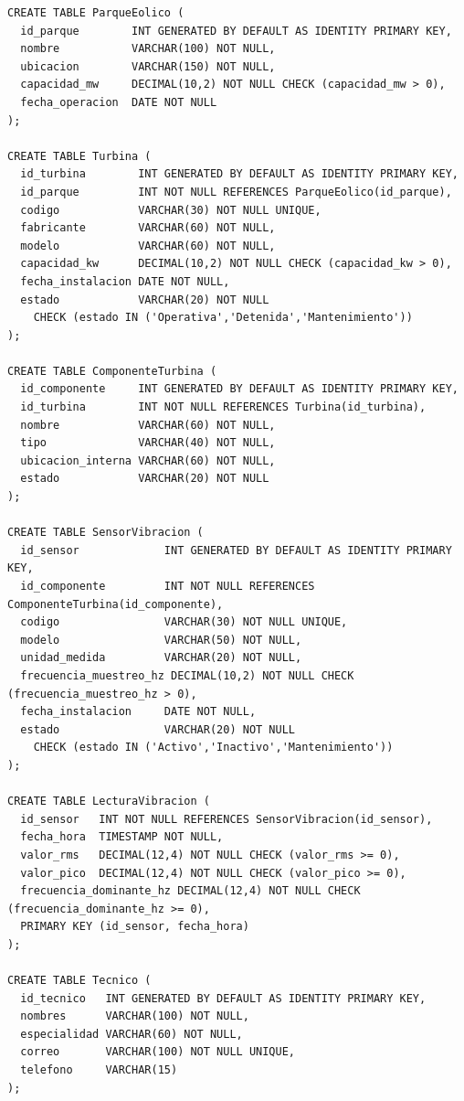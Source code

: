 \documentclass[11pt,a4paper]{article}
\begin{document}
\begin{lstlisting}
CREATE TABLE ParqueEolico (
  id_parque        INT GENERATED BY DEFAULT AS IDENTITY PRIMARY KEY,
  nombre           VARCHAR(100) NOT NULL,
  ubicacion        VARCHAR(150) NOT NULL,
  capacidad_mw     DECIMAL(10,2) NOT NULL CHECK (capacidad_mw > 0),
  fecha_operacion  DATE NOT NULL
);

CREATE TABLE Turbina (
  id_turbina        INT GENERATED BY DEFAULT AS IDENTITY PRIMARY KEY,
  id_parque         INT NOT NULL REFERENCES ParqueEolico(id_parque),
  codigo            VARCHAR(30) NOT NULL UNIQUE,
  fabricante        VARCHAR(60) NOT NULL,
  modelo            VARCHAR(60) NOT NULL,
  capacidad_kw      DECIMAL(10,2) NOT NULL CHECK (capacidad_kw > 0),
  fecha_instalacion DATE NOT NULL,
  estado            VARCHAR(20) NOT NULL
    CHECK (estado IN ('Operativa','Detenida','Mantenimiento'))
);

CREATE TABLE ComponenteTurbina (
  id_componente     INT GENERATED BY DEFAULT AS IDENTITY PRIMARY KEY,
  id_turbina        INT NOT NULL REFERENCES Turbina(id_turbina),
  nombre            VARCHAR(60) NOT NULL,
  tipo              VARCHAR(40) NOT NULL,
  ubicacion_interna VARCHAR(60) NOT NULL,
  estado            VARCHAR(20) NOT NULL
);

CREATE TABLE SensorVibracion (
  id_sensor             INT GENERATED BY DEFAULT AS IDENTITY PRIMARY KEY,
  id_componente         INT NOT NULL REFERENCES ComponenteTurbina(id_componente),
  codigo                VARCHAR(30) NOT NULL UNIQUE,
  modelo                VARCHAR(50) NOT NULL,
  unidad_medida         VARCHAR(20) NOT NULL,
  frecuencia_muestreo_hz DECIMAL(10,2) NOT NULL CHECK (frecuencia_muestreo_hz > 0),
  fecha_instalacion     DATE NOT NULL,
  estado                VARCHAR(20) NOT NULL
    CHECK (estado IN ('Activo','Inactivo','Mantenimiento'))
);

CREATE TABLE LecturaVibracion (
  id_sensor   INT NOT NULL REFERENCES SensorVibracion(id_sensor),
  fecha_hora  TIMESTAMP NOT NULL,
  valor_rms   DECIMAL(12,4) NOT NULL CHECK (valor_rms >= 0),
  valor_pico  DECIMAL(12,4) NOT NULL CHECK (valor_pico >= 0),
  frecuencia_dominante_hz DECIMAL(12,4) NOT NULL CHECK (frecuencia_dominante_hz >= 0),
  PRIMARY KEY (id_sensor, fecha_hora)
);

CREATE TABLE Tecnico (
  id_tecnico   INT GENERATED BY DEFAULT AS IDENTITY PRIMARY KEY,
  nombres      VARCHAR(100) NOT NULL,
  especialidad VARCHAR(60) NOT NULL,
  correo       VARCHAR(100) NOT NULL UNIQUE,
  telefono     VARCHAR(15)
);


\end{lstlisting}
\end{document}

